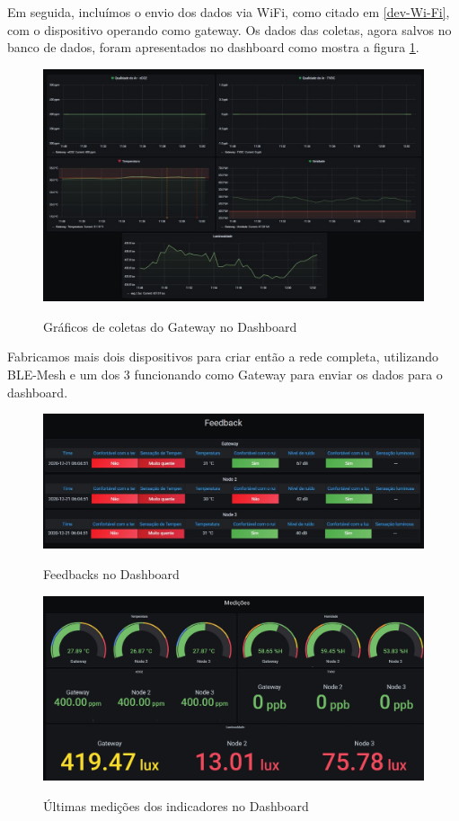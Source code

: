 \documentclass[../monografia.tex]{subfiles}
\begin{document}
Em seguida, incluímos o envio dos dados via WiFi, como citado em \ref{dev-Wi-Fi}, com o dispositivo operando como gateway. Os dados das coletas, agora salvos no banco de dados, foram apresentados no dashboard como mostra a figura \ref{fig:dashboard-graphs}.

\begin{figure}[h]
	\centering
	\includegraphics[width=\textwidth]{dashboard-graphs}
	\label{fig:dashboard-graphs}
	\caption{Gráficos de coletas do Gateway no Dashboard}
\end{figure}

Fabricamos mais dois dispositivos para criar então a rede completa, utilizando BLE-Mesh e um dos 3 funcionando como Gateway para enviar os dados para o dashboard. 

\begin{figure}[h]
	\centering
	\includegraphics[width=\textwidth]{dashboard-feedback}
	\label{fig:dashboard-feedback}
	\caption{Feedbacks no Dashboard}
\end{figure}

\begin{figure}[h]
	\centering
	\includegraphics[width=\textwidth]{dashboard-medicoes}
	\label{fig:dashboard-medicoes}
	\caption{Últimas medições dos indicadores no Dashboard}
\end{figure}
\end{document}
